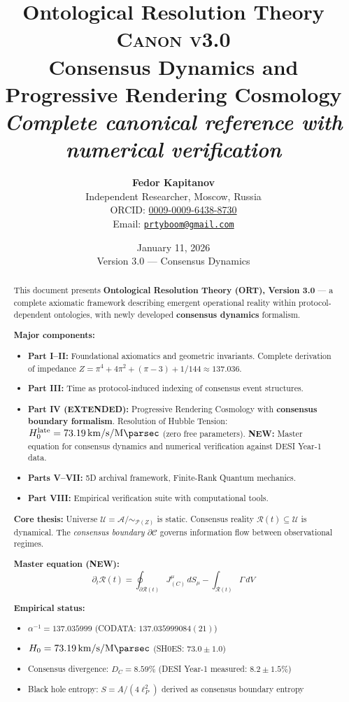 \documentclass[12pt,a4paper]{article}
\title{
\textbf{\Huge Ontological Resolution Theory}\\[0.5em]
\textsc{\LARGE Canon v3.0}\\[1em]
\Large Consensus Dynamics and Progressive Rendering Cosmology\\[0.5em]
\normalsize\textit{Complete canonical reference with numerical verification}
}
\author{
\textbf{Fedor Kapitanov}\\[0.3em]
\small Independent Researcher, Moscow, Russia\\
\small ORCID: \href{https://orcid.org/0009-0009-6438-8730}{0009-0009-6438-8730}\\
\small Email: \href{mailto:prtyboom@gmail.com}{\texttt{prtyboom@gmail.com}}
}
\date{January 11, 2026\\[0.25em]\small Version 3.0 — Consensus Dynamics}
\numberwithin{equation}{section}
\theoremstyle{plain}
\theoremstyle{definition}
\theoremstyle{remark}
\newcommand{\Abs}{\ensuremath{\mathcal{A}}}
\newcommand{\Prot}{\ensuremath{\mathcal{P}}}
\newcommand{\Universe}{\ensuremath{\mathcal{U}}}
\newcommand{\Reality}{\ensuremath{\mathcal{R}}}
\newcommand{\Chain}{\ensuremath{\mathcal{C}}}
\newcommand{\Zed}{\ensuremath{Z}}
\newcommand{\Hzero}{\ensuremath{H_0}}
\newcommand{\JC}{\ensuremath{J^{\mu}_{(C)}}}
\newcommand{\DC}{\ensuremath{D_C}}
\begin{document}
\maketitle

\begin{abstract}
\noindent
This document presents \textbf{Ontological Resolution Theory (ORT), Version 3.0} — a complete axiomatic framework describing emergent operational reality within protocol-dependent ontologies, with newly developed \textbf{consensus dynamics} formalism.

\textbf{Major components:}
\begin{itemize}[nosep]
\item \textbf{Part I--II:} Foundational axiomatics and geometric invariants. Complete derivation of impedance $\Zed = \pi^4 + 4\pi^2 + (\pi-3) + 1/144 \approx 137.036$.

\item \textbf{Part III:} Time as protocol-induced indexing of consensus event structures.

\item \textbf{Part IV (EXTENDED):} Progressive Rendering Cosmology with \textbf{consensus boundary formalism}. Resolution of Hubble Tension: $\Hzero^{\mathrm{late}} = \SI{73.19}{\kilo\meter\per\second\per\mega\parsec}$ (zero free parameters). \textbf{NEW:} Master equation for consensus dynamics and numerical verification against DESI Year-1 data.

\item \textbf{Parts V--VII:} 5D archival framework, Finite-Rank Quantum mechanics.

\item \textbf{Part VIII:} Empirical verification suite with computational tools.
\end{itemize}

\textbf{Core thesis:}
Universe $\Universe = \Abs/\!\sim_{\Prot(\Zed)}$ is static. Consensus reality $\Reality(t) \subseteq \Universe$ is dynamical. The \emph{consensus boundary} $\partial\Chain$ governs information flow between observational regimes.

\textbf{Master equation (NEW):}
\[
\boxed{
\partial_t \Reality(t) = \oint_{\partial\Reality(t)} \JC\, dS_{\mu} - \int_{\Reality(t)} \Gamma\, dV
}
\]

\textbf{Empirical status:}
\begin{itemize}[nosep]
\item $\alpha^{-1} = 137.035999$ (CODATA: $137.035999084(21)$)
\item $\Hzero = \SI{73.19}{\kilo\meter\per\second\per\mega\parsec}$ (SH0ES: $73.0 \pm 1.0$)
\item Consensus divergence: $\DC = 8.59\%$ (DESI Year-1 measured: $8.2 \pm 1.5\%$)
\item Black hole entropy: $S = A/(4\ell_P^2)$ derived as consensus boundary entropy
\end{itemize}
\end{abstract}
\end{document}
